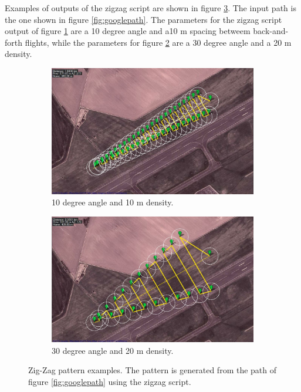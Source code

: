 Examples of outputs of the zigzag script are shown in figure \ref{fig:apmpath}. The input path is
the one shown in figure \ref{fig:googlepath}.
The parameters for the zigzag script output of figure \ref{fig:apmpath1} are a 10 degree angle and a10 m spacing betweem back-and-forth flights, while the parameters for figure \ref{fig:apmpath2} are
a 30 degree angle and a 20 m density.
\begin{figure}[ht]
\centering
  \begin{subfigure}[t]{0.45\textwidth}
    \includegraphics[width = \textwidth]{Images/apmpath10}
    \caption{10 degree angle and 10 m density.}
    \label{fig:apmpath1}
  \end{subfigure}
  \begin{subfigure}[t]{0.45\textwidth}
    \includegraphics[width = \textwidth]{Images/apmpath30}
    \caption{30 degree angle and 20 m density.}
    \label{fig:apmpath2}
  \end{subfigure}  
\caption[Zig-Zag pattern examples.]
{Zig-Zag pattern examples. The pattern is generated from the path of figure \ref{fig:googlepath}
using the zigzag script.}
\label{fig:apmpath}
\end{figure}

